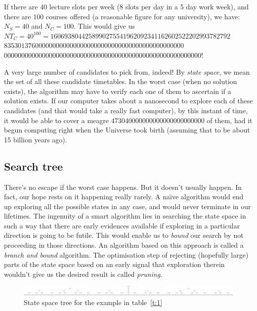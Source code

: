 \documentclass[11pt,a4paper]{article}
\begin{document}
If there are 40 lecture slots per week (8 slots per day in a 5 day work week), and there are 100 courses offered (a reasonable figure for any university), we have: $N_S = 40$ and $N_C = 100$. This would give us $NT_C = 40^{100} = 1606938044258990275541962092341162602522202993782792$ \\
$8353013760000000000000000000000000000000000000000000$ \\
$000000000000000000000000000000000000000000000000000000000$!

A very large number of candidates to pick from, indeed! By \emph{state space}, we mean the set of all these candidate timetables. In the worst case (when no solution exists), the algorithm may have to verify each one of them to ascertain if a solution exists. If our computer takes about a nanosecond to explore each of these candidates (and that would take a really fast computer), by this instant of time, it would be able to cover a meagre 473040000000000000000000000 of them, had it begun computing right when the Universe took birth (assuming that to be about 15 billion years ago).

\subsection{Search tree}
There's no escape if the worst case happens. But it doesn't usually happen. In fact, our hope rests on it happening really rarely. A na\"{\i}ve algorithm would end up exploring all the possible states in any case, and would never terminate in our lifetimes. The ingenuity of a smart algorithm lies in searching the state space in such a way that there are early evidences available if exploring in a particular direction is going to be futile. This would enable us to \emph{bound} our search by not proceeding in those directions. An algorithm based on this approach is called a \emph{branch and bound} algorithm. The optimisation step of rejecting (hopefully large) parts of the state space based on an early signal that exploration therein wouldn't give us the desired result is called \emph{pruning}. 
\begin{figure}
\begin{center}
\includegraphics[width=.9\textheight, angle=90]{images/ss1.eps}
\end{center}
\caption{State space tree for the example in table~\ref{t:1}}
\label{fig:ss1}
\end{figure} 
\end{document}
